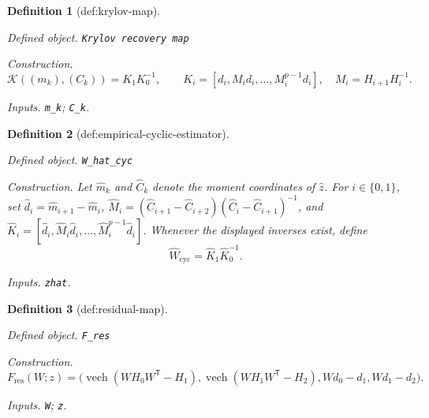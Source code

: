 \documentclass{article}
\newtheorem{definition}{Definition}
\begin{document}
\begin{definition}[def:krylov-map]\label{def:krylov-map}
\par\smallskip\noindent\emph{Defined object.} \texttt{Krylov recovery map}
\par\smallskip\noindent\emph{Construction.} \[\mathcal K((m_k),(C_k))=K_1K_0^{-1},\qquad K_i=[d_i,M_id_i,\ldots,M_i^{p-1}d_i],\quad M_i=H_{i+1}H_i^{-1}.\]
\par\smallskip\noindent\emph{Inputs.} \texttt{m\_\allowbreak{}k}; \texttt{C\_\allowbreak{}k}.
\end{definition}

\begin{definition}[def:empirical-cyclic-estimator]\label{def:empirical-cyclic-estimator}
\par\smallskip\noindent\emph{Defined object.} \texttt{W\_\allowbreak{}hat\_\allowbreak{}cyc}
\par\smallskip\noindent\emph{Construction.} Let \(\widehat m_k\) and \(\widehat C_k\) denote the moment coordinates of \(\widehat z\). For \(i\in\{0,1\}\), set \(\widehat d_i=\widehat m_{i+1}-\widehat m_i\), \(\widehat M_i=(\widehat C_{i+1}-\widehat C_{i+2})(\widehat C_i-\widehat C_{i+1})^{-1}\), and \(\widehat K_i=[\widehat d_i,\widehat M_i\widehat d_i,\ldots,\widehat M_i^{p-1}\widehat d_i]\). Whenever the displayed inverses exist, define \[\widehat W_{\mathrm{cyc}}=\widehat K_1\widehat K_0^{-1}.\]
\par\smallskip\noindent\emph{Inputs.} \texttt{zhat}.
\end{definition}

\begin{definition}[def:residual-map]\label{def:residual-map}
\par\smallskip\noindent\emph{Defined object.} \texttt{F\_\allowbreak{}res}
\par\smallskip\noindent\emph{Construction.} \[F_{\mathrm{res}}(W;z)=\bigl(\operatorname{vech}(WH_0W^{\mathsf T}-H_1),\operatorname{vech}(WH_1W^{\mathsf T}-H_2),Wd_0-d_1,Wd_1-d_2\bigr).\]
\par\smallskip\noindent\emph{Inputs.} \texttt{W}; \texttt{z}.
\end{definition}
\end{document}
